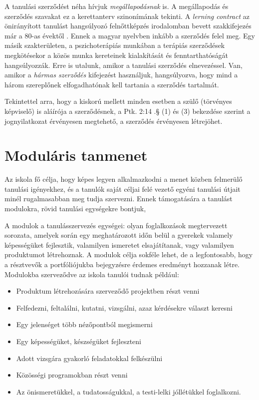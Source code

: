 A tanulási szerződést néha hívjuk \emph{megállapodásnak} is. A megállapodás és szerződés szavakat ez a kerettanterv szinonímának tekinti. A \emph{lerning contract} az önirányított tanulást hangsúlyozó felnőttképzés irodalomban
bevett szakkifejezés már a 80-as évektől \cite{Malcolm77}. Ennek a magyar nyelvben inkább a szerződés felel meg. Egy másik szakterületen, a pszichoterápiás munkában a terápiás szerződések megkötésekor a közös munka kereteinek kialakítását és fenntarthatóságát hangsúlyozzák. \cite{pszichoterapia} Erre is utalunk, amikor a tanulási szerződés elnevezéssel. Van, amikor a \emph{hármas szerződés} kifejezést használjuk, hangsúlyozva, hogy mind a három szereplőnek elfogadhatónak kell tartania a szerződés tartalmát.

Tekintettel arra, hogy a kiskorú mellett minden esetben a szülő (törvényes képviselő) is aláírója a szerződésnek, a Ptk. 2:14 .§ (1) és (3) bekezdése szerint a jognyilatkozat érvényesen megtehető, a szerződés érvényesen létrejöhet.

\section{Moduláris tanmenet}
\label{sec:modularis_tanmenet}

Az iskola fő célja, hogy képes legyen alkalmazkodni a menet közben felmerülő tanulási igényekhez, és a tanulók saját céljai felé vezető egyéni tanulási útjait minél rugalmasabban meg tudja szervezni. Ennek támogatására a tanulást modulokra, rövid tanulási egységekre bontjuk,

A modulok a tanulásszervezés egységei: olyan foglalkozások megtervezett sorozata, amelyek során egy meghatározott időn belül a gyerekek valamely képességüket fejlesztik, valamilyen ismeretet elsajátítanak, vagy valamilyen produktumot létrehoznak. A modulok célja sokféle lehet, de a legfontosabb, hogy a résztvevők a portfóliójukba bejegyzésre érdemes eredményt hozzanak létre. Modulokba szerveződve az iskola tanulói tudnak például:

\begin{itemize}
\item Produktum létrehozására szerveződő projektben részt venni
\item Felfedezni, feltalálni, kutatni, vizsgálni, azaz kérdésekre választ keresni
\item Egy jelenséget több nézőpontból megismerni
\item Egy képességüket, készségüket fejleszteni
\item Adott vizsgára gyakorló feladatokkal felkészülni
\item Közösségi programokban részt venni
\item Az önismeretükkel, a tudatosságukkal, a testi-lelki jóllétükkel foglalkozni.
\end{itemize}

